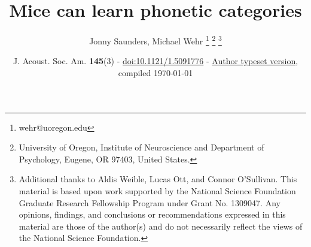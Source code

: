 \documentclass[11pt]{article}\usepackage[]{graphicx}\usepackage[]{color}
\begin{document}
\title{Mice can learn phonetic categories}
\author{Jonny Saunders, Michael Wehr 
\thanks{wehr@uoregon.edu} 
\thanks{University of Oregon, Institute of Neuroscience and Department of Psychology, Eugene, OR 97403, United States.} 
\thanks{Additional thanks to Aldis Weible, Lucas Ott, and Connor O'Sullivan. This material is based upon work supported by the National Science Foundation Graduate Research Fellowship Program under Grant No. 1309047. Any opinions, findings, and conclusions or recommendations expressed in this material are those of the author(s) and do not necessarily reflect the views of the National Science Foundation.}}
\date{\small J. Acoust. Soc. Am. \textbf{145}(3) - \href{https://doi.org/10.1121/1.5091776}{doi:10.1121/1.5091776} - \href{https://github.com/wehr-lab/SaundersWehr-JASA2019}{Author typeset version}, compiled \today }
































\twocolumn[
\maketitle
]
\saythanks
\end{document}
